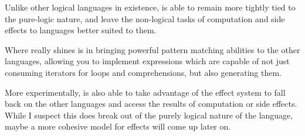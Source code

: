 Unlike other logical languages in existence, \Law{} is able to remain more
tightly tied to the pure-logic nature, and leave the non-logical tasks of
computation and side effects to languages better suited to them.

Where \Law{} really shines is in bringing powerful pattern matching
abilities to the other languages, allowing you to implement expressions
which are capable of not just consuming iterators for loops and
comprehensions, but also generating them.

More experimentally, \Law{} is also able to take advantage of the
effect system to fall back on the other languages and access the
results of computation or side effects. While I suspect this does
break out of the purely logical nature of the language, maybe a
more cohesive model for effects will come up later on.
